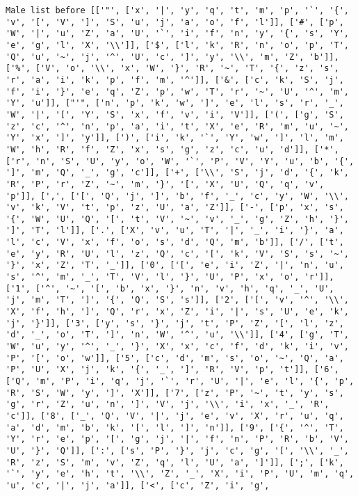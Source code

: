 \documentclass{article}
\begin{document}
\begin{verbatim}
Male list before [['"', ['x', '|', 'y', 'q', 't', 'm', 'p', '`', '{', 'v', '[', 'V', ']', 'S', 'u', 'j', 'a', 'o', 'f', 'l']], ['#', ['p', 'W', '|', 'u', 'Z', 'a', 'U', '`', 'i', 'f', 'n', 'y', '{', 's', 'Y', 'e', 'g', 'l', 'X', '\\']], ['$', ['l', 'k', 'R', 'n', 'o', 'p', 'T', 'Q', 'u', '~', 'j', '^', 'U', 'c', ']', 'y', '\\', 'm', 'Z', 'b']], ['%', ['V', 'o', '\\', 'x', 'W', '}', 'R', '~', 'T', '{', 'z', 's', 'r', 'a', 'i', 'k', 'p', 'f', 'm', '^']], ['&', ['c', 'k', 'S', 'j', 'f', 'i', '}', 'e', 'q', 'Z', 'p', 'w', 'T', 'r', '~', 'U', '^', 'm', 'Y', 'u']], ["'", ['n', 'p', 'k', 'w', ']', 'e', 'l', 's', 'r', '_', 'W', '|', '[', 'Y', 'S', 'x', 'f', 'v', 'i', 'V']], ['(', ['g', 'S', 'z', 'c', '^', 'n', 'p', 'a', 'i', 't', 'X', 'e', 'R', 'm', 'u', '~', 'Y', 'x', ']', 'y']], [')', ['i', 'k', '`', 'Y', 'w', ']', 'l', 'm', 'W', 'h', 'R', 'f', 'Z', 'x', 's', 'g', 'z', 'c', 'u', 'd']], ['*', ['r', 'n', 'S', 'U', 'y', 'o', 'W', '`', 'P', 'V', 'Y', 'u', 'b', '{', ']', 'm', 'Q', '_', 'g', 'c']], ['+', ['\\', 'S', 'j', 'd', '{', 'k', 'R', 'P', 'r', 'Z', '~', 'm', '}', '[', 'X', 'U', 'Q', 'q', 'v', 'p']], [',', ['[', 'Q', 'j', ']', 'b', 'f', '_', 'c', 'y', 'W', '\\', 'v', 'k', 'V', 't', 'p', 'z', 'U', 'a', 'Z']], ['-', ['p', 'x', 's', '{', 'W', 'U', 'Q', '[', 't', 'V', '~', 'v', '_', 'g', 'Z', 'h', '}', ']', 'T', 'l']], ['.', ['X', 'v', 'u', 'T', '|', '_', 'i', '}', 'a', 'l', 'c', 'V', 'x', 'f', 'o', 's', 'd', 'Q', 'm', 'b']], ['/', ['t', 'e', 'y', 'R', 'U', 'l', 'z', 'Q', 'c', '[', 'k', 'V', 'S', 's', '~', '}', 'x', 'Z', 'T', '_']], ['0', ['[', 'e', 'i', 'Z', '|', 'n', 'u', 's', '^', 'm', '_', 'T', 'V', 'l', '}', 'U', 'P', 'x', 'o', 'r']], ['1', ['^', '~', '[', 'b', 'x', '}', 'n', 'v', 'h', 'q', '_', 'U', 'j', 'm', 'T', ']', '{', 'Q', 'S', 's']], ['2', ['[', 'v', '^', '\\', 'X', 'f', 'h', ']', 'Q', 'r', 'x', 'Z', 'i', '|', 's', 'U', 'e', 'k', 'j', '}']], ['3', ['y', 's', '}', 'j', 't', 'P', 'Z', '[', 'l', 'z', 'd', '_', 'o', 'T', ']', 'n', 'W', '^', 'u', '\\']], ['4', ['g', 'T', 'W', 'u', 'y', '^', '_', '}', 'X', 'x', 'c', 'f', 'd', 'k', 'i', 'v', 'P', '[', 'o', 'w']], ['5', ['c', 'd', 'm', 's', 'o', '~', 'Q', 'a', 'P', 'U', 'X', 'j', 'k', '{', '_', ']', 'R', 'V', 'p', 't']], ['6', ['Q', 'm', 'P', 'i', 'q', 'j', '`', 'r', 'U', '|', 'e', 'l', '{', 'p', 'R', 'S', 'W', 'y', ']', 'X']], ['7', ['z', 'P', '~', 't', 'y', 's', 'g', 'r', 'Z', 'u', 'n', ']', 'V', 'j', '\\', 'i', 'x', '_', 'R', 'c']], ['8', ['_', 'Q', 'V', '|', 'j', 'e', 'v', 'X', 'r', 'u', 'q', 'a', 'd', 'm', 'b', 'k', '[', 'l', ']', 'n']], ['9', ['{', '^', 'T', 'Y', 'r', 'e', 'p', '[', 'g', 'j', '|', 'f', 'n', 'P', 'R', 'b', 'V', 'U', '}', 'Q']], [':', ['s', 'P', '}', 'j', 'c', 'g', '[', '\\', '_', 'R', 'z', 'S', 'm', 'v', 'Z', 'q', 'l', 'U', 'a', ']']], [';', ['k', '`', 'y', 'e', 'h', 't', '\\', 'Z', '_', 'X', 'i', 'P', 'U', 'm', 'q', 'u', 'c', '|', 'j', 'a']], ['<', ['c', 'Z', 'i', 'g', 
\end{verbatim}
\end{document}
